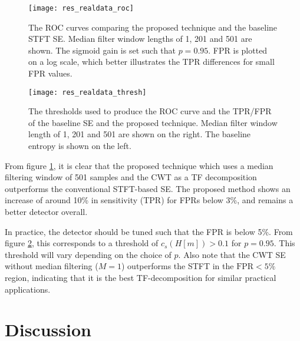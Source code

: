 \begin{figure}[h!]
	\centering
	\texttt{[image: res\_realdata\_roc]}
	\caption{The ROC curves comparing the proposed technique and the baseline STFT SE. Median filter window lengths of 1, 201 and 501 are shown. The sigmoid gain is set such that $p=0.95$. FPR is plotted on a log scale, which better illustrates the TPR differences for small FPR values.}
	\label{fig:res_realdata_roc}
\end{figure}

 \begin{figure}[h!]
	\centering
	\texttt{[image: res\_realdata\_thresh]}
	\caption{The thresholds used to produce the ROC curve and the TPR/FPR of the baseline SE and the proposed technique. Median filter window length of 1, 201 and 501 are shown on the right. The baseline entropy is shown on the left. }
	\label{fig:res_realdata_thresh}
\end{figure}

From figure \ref{fig:res_realdata_roc}, it is clear that the proposed technique which uses a median filtering window of 501 samples and the CWT as a TF decomposition outperforms the conventional STFT-based SE. The proposed method shows an increase of around 10\% in sensitivity (TPR) for FPRs  below 3\%, and remains a better detector overall. 

In practice, the detector should be tuned such that the FPR is below 5\%. From figure \ref{fig:res_realdata_thresh}, this corresponds to a threshold of $c_s(H[m]) > 0.1$ for $p=0.95$. This threshold will vary depending on the choice of $p$. Also note that the CWT SE without median filtering ($M=1$) outperforms the STFT in the $\text{FPR} < 5\%$ region, indicating that it is the best TF-decomposition for similar practical applications.

\section{Discussion}

